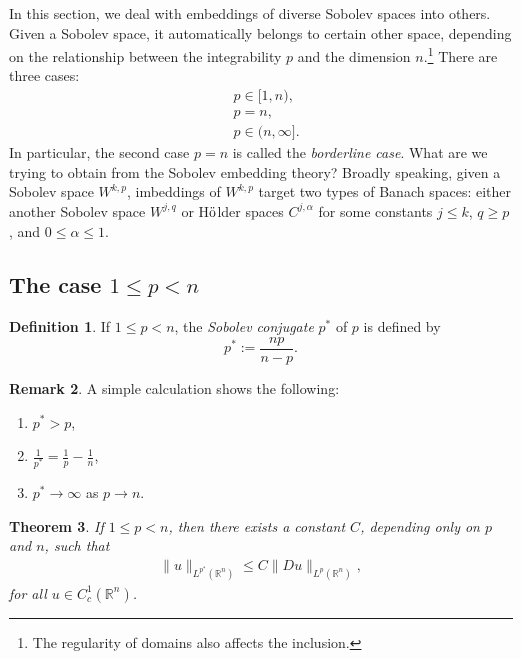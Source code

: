 \documentclass[a4paper,11pt]{article}
\newtheorem{theorem}{Theorem}[section]
\theoremstyle{definition}
\newtheorem{definition}[theorem]{Definition}
\newtheorem{remark}[theorem]{Remark}
\begin{document}
In this section, we deal with embeddings of diverse Sobolev spaces into others.
Given a Sobolev space, it automatically belongs to certain other space, depending on the relationship between the integrability $p$ and the dimension $n$.\footnote{The regularity of domains also affects the inclusion.}
There are three cases:
\begin{align*}
    &p \in [1, n), \\
    &p = n, \\
    &p \in (n, \infty].
\end{align*}
In particular, the second case $p = n$ is called the \emph{borderline case}. 
What are we trying to obtain from the Sobolev embedding theory?
Broadly speaking, given a Sobolev space $W^{k, p}$, imbeddings of $W^{k, p}$ target two types of Banach spaces: either another Sobolev space $W^{j, q}$ or H$\ddot{\rm o}$lder spaces $C^{j, \alpha}$ for some constants $j \leq k$, $q \geq p$, and $0 \leq \alpha \leq 1$.


\subsection{The case $1 \leq p < n$}

\begin{definition}
    If $1 \leq p < n$, the \emph{Sobolev conjugate} $p^{\ast}$ of $p$ is defined by 
    \begin{equation*} 
        p^{\ast} := \frac{np}{n-p}.
    \end{equation*}
\end{definition}

\begin{remark}
    A simple calculation shows the following:
    \begin{enumerate}[label=(\roman*)] 
    \rm\item $p^{\ast} > p$,
    \rm\item $\displaystyle \frac{1}{p^{\ast}} = \frac{1}{p} - \frac{1}{n}$,
    \rm\item $p^{\ast} \to \infty$ as $p \to n$.
    \end{enumerate}
\end{remark}

\begin{theorem}
    If $1 \leq p < n$, then there exists a constant $C$, depending only on $p$ and $n$, such that
    \begin{align*}
    \|u\|_{L^{p^*}\left(\mathbb{R}^n\right)} \leq C\|D u\|_{L^p\left(\mathbb{R}^n\right)},
    \end{align*}
    for all $u \in C_c^1\left(\mathbb{R}^n\right)$.
\end{theorem}
\end{document}
